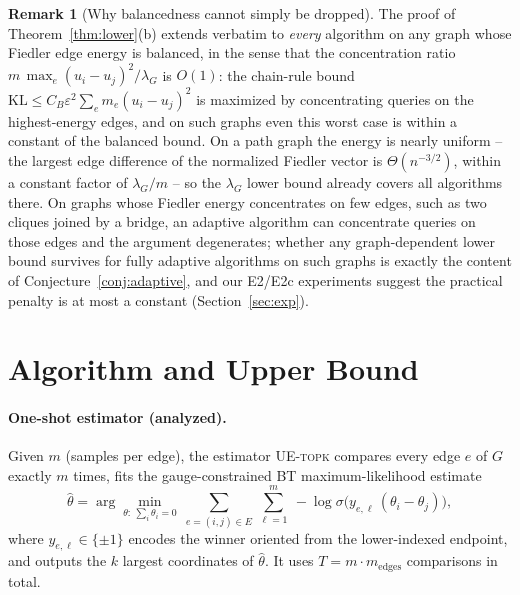 \documentclass[11pt]{article}
\theoremstyle{definition}
\newtheorem{remark}[theorem]{Remark}
\newcommand{\KL}{\mathrm{KL}}
\newcommand{\lG}{\lambda_G}
\begin{document}
\begin{remark}[Why balancedness cannot simply be dropped]
\label{rem:adaptive-gap}
The proof of Theorem~\ref{thm:lower}(b) extends verbatim to \emph{every} algorithm on any graph whose Fiedler edge energy is balanced, in the sense that the concentration ratio $m\,\max_e(u_i-u_j)^2/\lG$ is $O(1)$: the chain-rule bound $\KL\le C_B\varepsilon^2\sum_e m_e(u_i-u_j)^2$ is maximized by concentrating queries on the highest-energy edges, and on such graphs even this worst case is within a constant of the balanced bound.  On a path graph the energy is nearly uniform -- the largest edge difference of the normalized Fiedler vector is $\Theta(n^{-3/2})$, within a constant factor of $\lG/m$ -- so the $\lG$ lower bound already covers all algorithms there.  On graphs whose Fiedler energy concentrates on few edges, such as two cliques joined by a bridge, an adaptive algorithm can concentrate queries on those edges and the argument degenerates; whether any graph-dependent lower bound survives for fully adaptive algorithms on such graphs is exactly the content of Conjecture~\ref{conj:adaptive}, and our E2/E2c experiments suggest the practical penalty is at most a constant (Section~\ref{sec:exp}).
\end{remark}

\section{Algorithm and Upper Bound}
\label{sec:upper}

\paragraph{One-shot estimator (analyzed).}  Given $m$ (samples per edge), the estimator \textsc{UE-topk} compares every edge $e$ of $G$ exactly $m$ times, fits the gauge-constrained BT maximum-likelihood estimate
\begin{equation}
\hat\theta=\arg\min_{\theta:\ \sum_i\theta_i=0}\ \sum_{e=(i,j)\in E}\ \sum_{\ell=1}^{m}\ -\log\sigma\!\big(y_{e,\ell}\,(\theta_i-\theta_j)\big),
\label{eq:mle}
\end{equation}
where $y_{e,\ell}\in\{\pm1\}$ encodes the winner oriented from the lower-indexed endpoint, and outputs the $k$ largest coordinates of $\hat\theta$.  It uses $T=m\cdot m_{\mathrm{edges}}$ comparisons in total.
\end{document}
